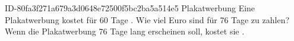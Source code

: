 \begin{exercise}
      {ID-80fa3f271a679a3d0648e72500f5bc2ba5a514e5}
      {Plakatwerbung}
  \ifproblem\problem
    Eine Plakatwerbung kostet für \num{60} Tage .
    Wie viel Euro sind für \num{76} Tage zu zahlen?
  \fi
  \ifoutcome\outcome
    Wenn die Plakatwerbung \num{76} Tage lang erscheinen soll, kostet sie .
  \fi
\end{exercise}
